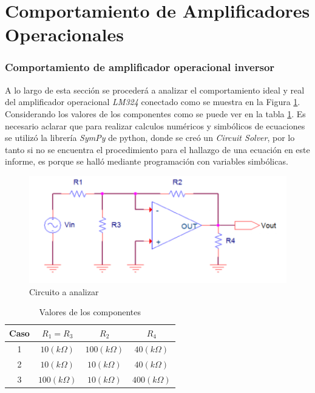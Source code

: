 \part{Comportamiento de Amplificadores Operacionales}

\section{Comportamiento de amplificador operacional inversor}

A lo largo de esta sección se procederá a analizar el comportamiento
ideal y real del amplificador operacional \emph{LM324 }conectado como
se muestra en la Figura \ref{1_a_1}. Considerando los valores de
los componentes como se puede ver en la tabla \ref{1_a_t_1}. Es necesario
aclarar que para realizar calculos numéricos y simbólicos de ecuaciones
se utilizó la librería \emph{SymPy }de python, donde se creó un \emph{Circuit
Solver}, por lo tanto si no se encuentra el procedimiento para el
hallazgo de una ecuación en este informe, es porque se halló mediante
programación con variables simbólicas.

\begin{figure}[H]
\begin{centering}
\includegraphics[scale=0.75]{../Ex1/iA/Resources1a/Circuito1a}
\par\end{centering}
\caption{Circuito a analizar}
\label{1_a_1}
\end{figure}

\begin{table}[H]
\begin{centering}
\begin{tabular}{|c|c|c|c|}
\hline 
Caso & $R_{1}=R_{3}$ & $R_{2}$ & $R_{4}$\tabularnewline
\hline 
\hline 
1 & $10\left(k\Omega\right)$ & $100\left(k\Omega\right)$ & $40\left(k\Omega\right)$\tabularnewline
\hline 
2 & $10\left(k\Omega\right)$ & $10\left(k\Omega\right)$ & $40\left(k\Omega\right)$\tabularnewline
\hline 
3 & $100\left(k\Omega\right)$ & $10\left(k\Omega\right)$ & $400\left(k\Omega\right)$\tabularnewline
\hline 
\end{tabular}
\par\end{centering}
\caption{Valores de los componentes}
\label{1_a_t_1}

\end{table}

